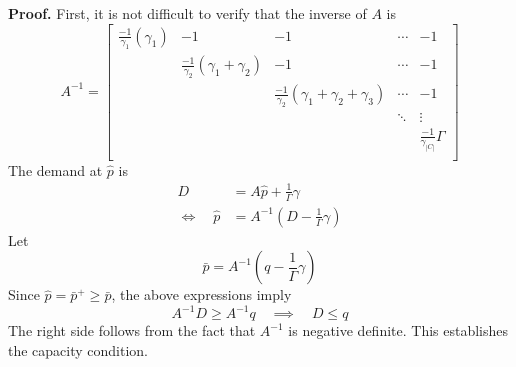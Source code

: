 \documentclass[12pt]{article}
\theoremstyle{definition}
\begin{document}
\textbf{Proof.} First, it is not difficult to verify that the inverse of $A$ is
\[A^{-1} = \begin{bmatrix}
\frac{-1}{\gamma_1}\left( \gamma_1 \right) & -1 & -1 &\cdots & -1 \\
 & \frac{-1}{\gamma_2}\left( \gamma_1 + \gamma_2 \right) & -1 &\cdots & -1 \\
 & & \frac{-1}{\gamma_2}\left( \gamma_1 + \gamma_2 + \gamma_3 \right) &\cdots & -1 \\
 &  &  & \ddots & \vdots \\
 & & & &  \frac{-1}{\gamma_{|C|}} \Gamma \\
\end{bmatrix}\]
The demand at $\hat p$ is 
\begin{align}
D &= A \hat p + \frac{1}{\Gamma}\gamma \\
\iff \quad \hat p &= A^{-1} (D - \frac{1}{\Gamma} \gamma)
\end{align}
Let
\[\bar p = A^{-1} (q - \frac{1}{\Gamma} \gamma)\]
Since $\hat p = \bar p^+ \geq \bar p$, the above expressions imply
\[A^{-1} D \geq A^{-1} q \quad \implies \quad D \leq q\]
The right side follows from the fact that $A^{-1}$ is negative definite. This establishes the capacity condition. 
\end{document}
